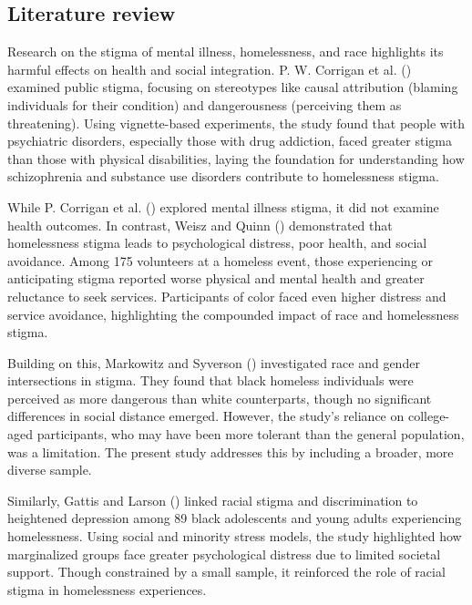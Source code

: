 \documentclass[
  man,
  floatsintext,
  longtable,
  nolmodern,
  notxfonts,
  notimes,
  colorlinks=true,linkcolor=blue,citecolor=blue,urlcolor=blue]{apa7}
\begin{document}
\subsection{Literature review}\label{literature-review}

Research on the stigma of mental illness, homelessness, and race
highlights its harmful effects on health and social integration. P. W.
Corrigan et al. ()
examined public stigma, focusing on stereotypes like causal attribution
(blaming individuals for their condition) and dangerousness (perceiving
them as threatening). Using vignette-based experiments, the study found
that people with psychiatric disorders, especially those with drug
addiction, faced greater stigma than those with physical disabilities,
laying the foundation for understanding how schizophrenia and substance
use disorders contribute to homelessness stigma.

While P. Corrigan et al.
() explored
mental illness stigma, it did not examine health outcomes. In contrast,
Weisz and Quinn
()
demonstrated that homelessness stigma leads to psychological distress,
poor health, and social avoidance. Among 175 volunteers at a homeless
event, those experiencing or anticipating stigma reported worse physical
and mental health and greater reluctance to seek services. Participants
of color faced even higher distress and service avoidance, highlighting
the compounded impact of race and homelessness stigma.

Building on this, Markowitz and Syverson
() investigated
race and gender intersections in stigma. They found that black homeless
individuals were perceived as more dangerous than white counterparts,
though no significant differences in social distance emerged. However,
the study's reliance on college-aged participants, who may have been
more tolerant than the general population, was a limitation. The present
study addresses this by including a broader, more diverse sample.

Similarly, Gattis and Larson
() linked racial
stigma and discrimination to heightened depression among 89 black
adolescents and young adults experiencing homelessness. Using social and
minority stress models, the study highlighted how marginalized groups
face greater psychological distress due to limited societal support.
Though constrained by a small sample, it reinforced the role of racial
stigma in homelessness experiences.
\end{document}
